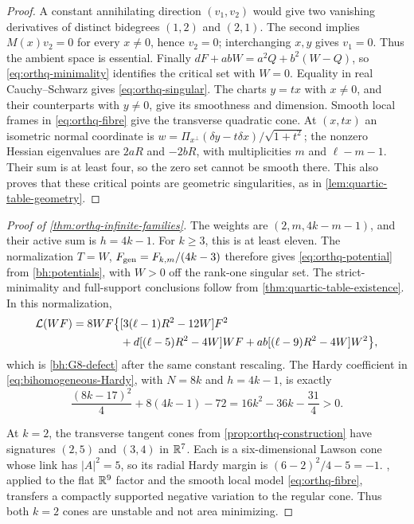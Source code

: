 \begin{proof}
A constant annihilating direction $(v_1,v_2)$ would give two
vanishing derivatives of distinct bidegrees $(1,2)$ and $(2,1)$.
The second implies $M(x)v_2=0$ for every $x\ne0$, hence $v_2=0$;
interchanging $x,y$ gives $v_1=0$. Thus the ambient space is essential.
Finally $dF+abW=a^2Q+b^2(W-Q)$, so \eqref{eq:orthq-minimality}
identifies the critical set with $W=0$. Equality in real
Cauchy--Schwarz gives \eqref{eq:orthq-singular}. The charts $y=tx$
with $x\ne0$, and their counterparts with $y\ne0$, give its smoothness
and dimension. Smooth local frames in \eqref{eq:orthq-fibre} give
the transverse quadratic cone. At $(x,tx)$ an isometric normal
coordinate is $w=\Pi_{x^\perp}(\delta y-t\delta x)/\sqrt{1+t^2}$; the
nonzero Hessian eigenvalues are $2aR$ and $-2bR$, with multiplicities
$m$ and $\ell-m-1$. Their sum is at least four, so the zero set
cannot be smooth there. This also proves that these critical points
are geometric singularities, as in \cref{lem:quartic-table-geometry}.
\end{proof}

\begin{proof}[Proof of \cref{thm:orthq-infinite-families}]
The weights are $(2,m,4k-m-1)$, and their active sum is $h=4k-1$.
For $k\ge3$, this is at least eleven. The normalization
$T=W$, $F_{\rm gen}=F_{k,m}/(4k-3)$ therefore gives
\eqref{eq:orthq-potential} from \eqref{bh:potentials}, with $W>0$
off the rank-one singular set. The strict-minimality and full-support
conclusions follow from \cref{thm:quartic-table-existence}. In this normalization,
\begin{equation}\label{eq:orthq-potential-defect}
 \begin{split}
 \mathcal L(WF)=8WF\bigl\{&[3(\ell-1)R^2-12W]F^2\\
 &+d[(\ell-5)R^2-4W]WF
 +ab[(\ell-9)R^2-4W]W^2\bigr\},
 \end{split}
\end{equation}
which is \eqref{bh:G8-defect} after the same constant rescaling.
The Hardy coefficient in \eqref{eq:bihomogeneous-Hardy}, with
$N=8k$ and $h=4k-1$, is exactly
\[
 \frac{(8k-17)^2}{4}+8(4k-1)-72
 =16k^2-36k-\frac{31}{4}>0.
\]

At $k=2$, the transverse tangent cones from
\cref{prop:orthq-construction} have signatures $(2,5)$ and $(3,4)$
in $\mathbb R^7$. Each is a six-dimensional Lawson cone whose link has
$|A|^2=5$, so its radial Hardy margin is
$(6-2)^2/4-5=-1$. ,
applied to the flat $\mathbb R^9$
factor and the smooth local model \eqref{eq:orthq-fibre}, transfers
a compactly supported negative variation to the regular cone.
Thus both $k=2$ cones are unstable and not area minimizing.
\end{proof}

